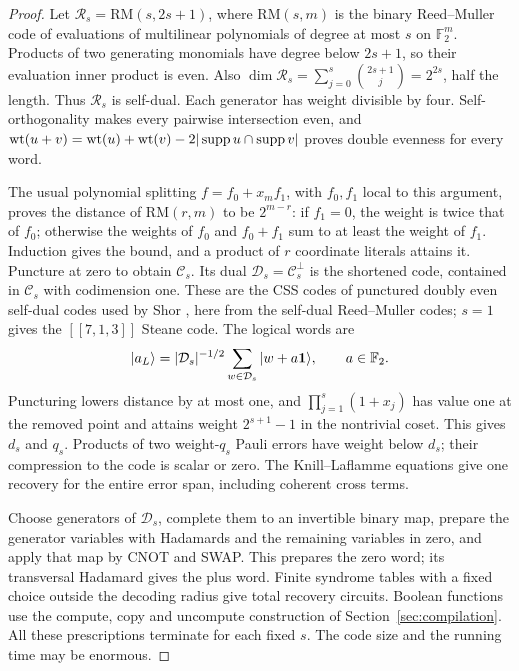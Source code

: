 \begin{proof}
Let \(\mathcal R_s=\mathrm{RM}(s,2s+1)\), where \(\mathrm{RM}(s,m)\)
is the binary Reed--Muller code of evaluations of multilinear polynomials
of degree at most \(s\) on \(\mathbb F_2^m\).
Products of two generating monomials have degree below \(2s+1\),
so their evaluation inner product is even. Also
\(\dim\mathcal R_s=\sum_{j=0}^s\binom{2s+1}{j}=2^{2s}\), half the
length. Thus \(\mathcal R_s\) is self-dual. Each generator has weight
divisible by four. Self-orthogonality makes every pairwise intersection
even, and \(\mathrm{wt}(u+v)=\mathrm{wt}(u)+\mathrm{wt}(v)
-2|\operatorname{supp} u\cap\operatorname{supp} v|\) proves double evenness for every word.

The usual polynomial splitting \(f=f_0+x_m f_1\), with \(f_0,f_1\) local to this argument, proves the distance of
\(\mathrm{RM}(r,m)\) to be \(2^{m-r}\): if \(f_1=0\), the weight
is twice that of \(f_0\); otherwise the weights of \(f_0\) and
\(f_0+f_1\) sum to at least the weight of \(f_1\). Induction gives
the bound, and a product of \(r\) coordinate literals attains it.
Puncture at zero to obtain \(\mathcal C_s\). Its dual
\(\mathcal D_s=\mathcal C_s^\perp\) is the shortened code, contained
in \(\mathcal C_s\) with codimension one. These are the CSS codes of
punctured doubly even self-dual codes used by Shor
\cite[Sections~5 and~7]{Shor1996}, here from the self-dual Reed--Muller
codes; \(s=1\) gives the \([[7,1,3]]\) Steane code. The logical words are
\[
 |a_L\rangle=|\mathcal D_s|^{-1/2}
       \sum_{w\in\mathcal D_s}|w+a\mathbf 1\rangle,
       \qquad a\in\mathbb F_2.
\]
Puncturing lowers distance by at most one, and
\(\prod_{j=1}^s(1+x_j)\) has value one at the removed point and
attains weight \(2^{s+1}-1\) in the nontrivial coset. This gives
\(d_s\) and \(q_s\). Products of two weight-\(q_s\) Pauli errors
have weight below \(d_s\); their compression to the code is scalar
or zero. The Knill--Laflamme equations \cite{KnillLaflamme1997} give one recovery
for the entire error span, including coherent cross terms.

Choose generators of \(\mathcal D_s\), complete them to an invertible
binary map, prepare the generator variables with Hadamards and the
remaining variables in zero, and apply that map by CNOT and SWAP.
This prepares the zero word; its transversal Hadamard gives the plus
word. Finite syndrome tables with a fixed choice outside the decoding
radius give total recovery circuits. Boolean functions use the
compute, copy and uncompute construction of
Section~\ref{sec:compilation}. All these prescriptions terminate for
each fixed \(s\). The code size and the running time may be enormous.
\end{proof}

